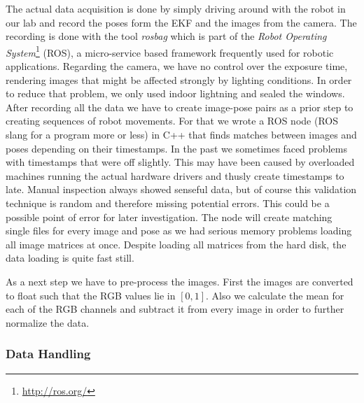 \documentclass[a4paper,11pt]{article}
\begin{document}
The actual data acquisition is done by simply driving around with the robot in our lab and record the poses form the EKF and the images from the camera. The recording is done with the tool \emph{rosbag} which is part of the \emph{Robot Operating System}\footnote{\url{http://ros.org/}} (ROS), a micro-service based framework frequently used for robotic applications. Regarding the camera, we have no control over the exposure time, rendering images that might be affected strongly by lighting conditions. In order to reduce that problem, we only used indoor lightning and sealed the windows.
After recording all the data we have to create image-pose pairs as a prior step to creating sequences of robot movements. For that we wrote a ROS node (ROS slang for a program more or less) in C++ that finds matches between images and poses depending on their timestamps. In the past we sometimes faced problems with timestamps that were off slightly. This may have been caused by overloaded machines running the actual hardware drivers and thusly create timestamps to late. Manual inspection always showed senseful data, but of course this validation technique is random and therefore missing potential errors. This could be a possible point of error for later investigation.
The node will create matching single files for every image and pose as we had serious memory problems loading all image matrices at once. Despite loading all matrices from the hard disk, the data loading is quite fast still.

As a next step we have to pre-process the images. First the images are converted to float such that the RGB values lie in $[0,1]$. Also we calculate the mean for each of the RGB channels and subtract it from every image in order to further normalize the data.




\subsubsection{Data Handling}
\end{document}
